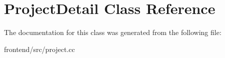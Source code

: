 \hypertarget{classProjectDetail}{\section{Project\-Detail Class Reference}
\label{classProjectDetail}
}


The documentation for this class was generated from the following file\-:\begin{DoxyCompactItemize}
\item 
frontend/src/project.\-cc\end{DoxyCompactItemize}
